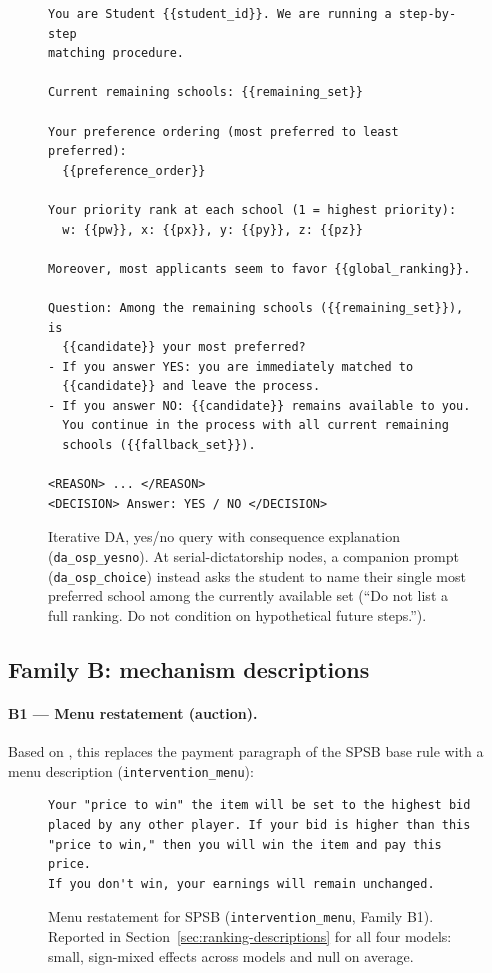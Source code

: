 \begin{figure}[H]
\begin{lstlisting}
You are Student {{student_id}}. We are running a step-by-step
matching procedure.

Current remaining schools: {{remaining_set}}

Your preference ordering (most preferred to least preferred):
  {{preference_order}}

Your priority rank at each school (1 = highest priority):
  w: {{pw}}, x: {{px}}, y: {{py}}, z: {{pz}}

Moreover, most applicants seem to favor {{global_ranking}}.

Question: Among the remaining schools ({{remaining_set}}), is
  {{candidate}} your most preferred?
- If you answer YES: you are immediately matched to
  {{candidate}} and leave the process.
- If you answer NO: {{candidate}} remains available to you.
  You continue in the process with all current remaining
  schools ({{fallback_set}}).

<REASON> ... </REASON>
<DECISION> Answer: YES / NO </DECISION>
\end{lstlisting}
\caption{Iterative DA, yes/no query with consequence explanation (\texttt{da\_osp\_yesno}). At serial-dictatorship nodes, a companion prompt (\texttt{da\_osp\_choice}) instead asks the student to name their single most preferred school among the currently available set (``Do not list a full ranking. Do not condition on hypothetical future steps.'').}
\label{fig:prompt-da-osp-yesno}
\end{figure}

\subsection{Family B: mechanism descriptions}\label{app:prompts-desc}

\paragraph{B1 --- Menu restatement (auction).} Based on \citet{gonczarowski2023strategyproofness}, this replaces the payment paragraph of the SPSB base rule with a menu description (\texttt{intervention\_menu}):

\begin{figure}[H]
\begin{lstlisting}
Your "price to win" the item will be set to the highest bid
placed by any other player. If your bid is higher than this
"price to win," then you will win the item and pay this price.
If you don't win, your earnings will remain unchanged.
\end{lstlisting}
\caption{Menu restatement for SPSB (\texttt{intervention\_menu}, Family B1). Reported in Section~\ref{sec:ranking-descriptions} for all four models: small, sign-mixed effects across models and null on average.}
\label{fig:prompt-menu}
\end{figure}

